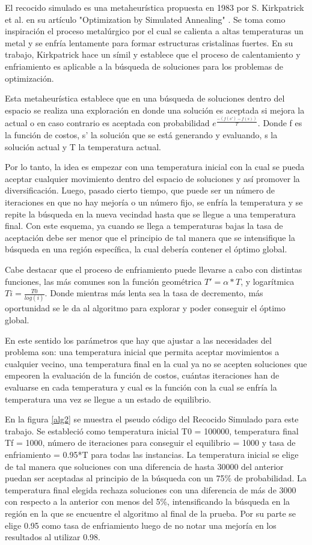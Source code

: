 \documentclass{ci5652}
\begin{document}
 El recocido simulado es una metaheurística propuesta en 1983 por S. Kirkpatrick et al. en su artículo "Optimization by Simulated Annealing" \cite{7}. Se toma como inspiración el proceso metalúrgico por el cual se calienta a altas temperaturas un metal y se enfría lentamente para formar estructuras cristalinas fuertes.
 En su trabajo, Kirkpatrick hace un símil y establece que el proceso de calentamiento y enfriamiento es aplicable a la búsqueda de soluciones para los problemas de optimización.

Esta metaheurística establece que en una búsqueda de soluciones dentro del espacio se realiza una exploración en donde una solución es aceptada si mejora la actual o en caso contrario es aceptada con probabilidad $e^{\frac{-(f(s')-f(s))}{T}}$. Donde f es la función de costos, s' la solución que se está generando y evaluando, s la solución actual y T la temperatura actual.

Por lo tanto, la idea es empezar con una temperatura inicial con la cual se pueda aceptar cualquier movimiento dentro del espacio de soluciones y así promover la diversificación. Luego, pasado cierto tiempo, que puede ser un número de iteraciones en que no hay mejoría o un número fijo, se enfría la temperatura y se repite la búsqueda en la nueva vecindad hasta que se llegue a una temperatura final. Con este esquema, ya cuando se llega a temperaturas bajas la tasa de aceptación debe ser menor que el principio de tal manera que se intensifique la búsqueda en una región específica, la cual debería contener el óptimo global.

Cabe destacar que el proceso de enfriamiento puede llevarse a cabo con distintas funciones, las más comunes son la función geométrica $ T' = \alpha*T$, y logarítmica $Ti = \frac{T0}{log(i)}$. Donde mientras más lenta sea la tasa de decremento, más oportunidad se le da al algoritmo para explorar y poder conseguir el óptimo global.

En este sentido los parámetros que hay que ajustar a las necesidades del problema son: una temperatura inicial que permita aceptar movimientos a cualquier vecino, una temperatura final en la cual ya no se acepten soluciones que empeoren la evaluación de la función de costos, cuántas iteraciones han de evaluarse en cada temperatura y cual es la función con la cual se enfría la temperatura una vez se llegue a un estado de equilibrio.

En la figura \ref{alg2} se muestra el pseudo código del Recocido Simulado para este trabajo. Se estableció como temperatura inicial T0 = 100000, temperatura final Tf = 1000, número de iteraciones para conseguir el equilibrio = 1000 y tasa de enfriamiento = 0.95*T para todas las instancias. La temperatura inicial se elige de tal manera que soluciones con una diferencia de hasta 30000 del anterior puedan ser aceptadas al principio de la búsqueda con un 75\% de probabilidad. La temperatura final elegida rechaza soluciones con una diferencia de más de 3000 con respecto a la anterior con menos del 5\%, intensificando la búsqueda en la región en la que se encuentre el algoritmo al final de la prueba. Por su parte se elige 0.95 como tasa de enfriamiento luego de no notar una mejoría en los resultados al utilizar 0.98.
\end{document}
